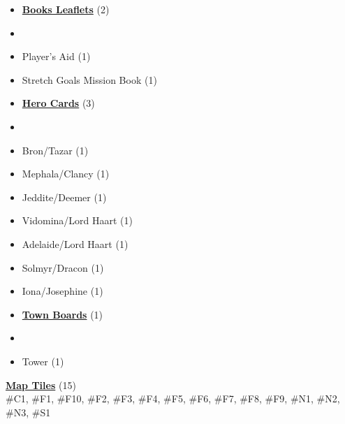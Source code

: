
\begin{multicols}{3}

\footnotesize

\begin{itemize}[leftmargin=0pt, label={}, noitemsep]
  \item \textbf{\small{\underline{Books Leaflets}}} (2)
  \item
  \item Player's Aid (1)
  \item Stretch Goals Mission Book (1)
\end{itemize}

\begin{itemize}[leftmargin=0pt, label={}, noitemsep]
  \item \textbf{\small{\underline{Hero Cards}}} (3)
  \item
  \item Bron/Tazar (1)
  \item Mephala/Clancy (1)
  \item Jeddite/Deemer (1)
  \item Vidomina/Lord Haart (1)
  \item Adelaide/Lord Haart (1)
  \item Solmyr/Dracon (1)
  \item Iona/Josephine (1)
\end{itemize}

\begin{itemize}[leftmargin=0pt, label={}, noitemsep]
  \item \textbf{\small{\underline{Town Boards}}} (1)
  \item
  \item Tower (1)
\end{itemize}

\textbf{\small{\underline{Map Tiles}}} (15)\\

\#C1, \#F1, \#F10, \#F2, \#F3, \#F4, \#F5, \#F6, \#F7, \#F8, \#F9, \#N1, \#N2, \#N3, \#S1


\end{multicols}
